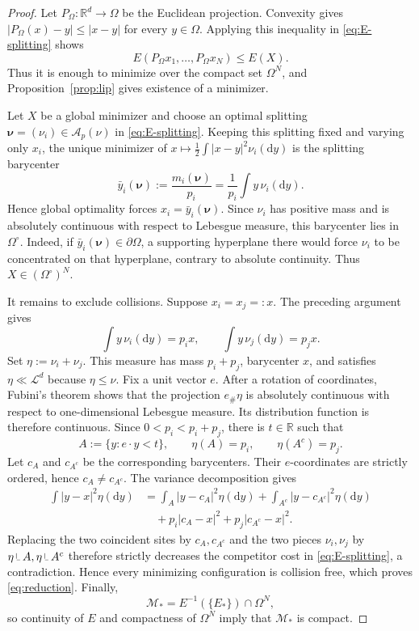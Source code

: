 \documentclass[11pt]{article}
\def\R{\mathbb{R}}
\def\Ac{{\mathcal A}}
\def\Mc{{\mathcal M}}
\newcommand{\dd}{\mathrm{d}}
\newcommand{\Leb}{\mathcal L}
\newcommand{\restr}{\mathbin{\vrule height 1.4ex depth -0.3ex width 0.08ex\vrule height 0.08ex depth -0.02ex width 0.7ex}}
\theoremstyle{definition}
\theoremstyle{remark}
\numberwithin{equation}{section}
\begin{document}
\begin{proof}
Let $P_\Omega:\R^d\to\Omega$ be the Euclidean projection.  Convexity gives
$|P_\Omega(x)-y|\le|x-y|$ for every $y\in\Omega$.  Applying this inequality in
\eqref{eq:E-splitting} shows
\begin{equation}\label{eq:projection-lowers}
 E(P_\Omega x_1,\ldots,P_\Omega x_N)\le E(X).
\end{equation}
Thus it is enough to minimize over the compact set $\Omega^N$, and Proposition~\ref{prop:lip}
gives existence of a minimizer.

Let $X$ be a global minimizer and choose an optimal splitting
$\boldsymbol\nu=(\nu_i)\in\Ac_p(\nu)$ in \eqref{eq:E-splitting}.  Keeping this splitting fixed and
varying only $x_i$, the unique minimizer of
$x\mapsto\frac12\int|x-y|^2\nu_i(\dd y)$ is the splitting barycenter
\begin{equation}\label{eq:barycenter-splitting}
 \bar y_i(\boldsymbol\nu):=\frac{m_i(\boldsymbol\nu)}{p_i}
 =\frac1{p_i}\int y\,\nu_i(\dd y).
\end{equation}
Hence global optimality forces $x_i=\bar y_i(\boldsymbol\nu)$.  Since $\nu_i$ has positive mass
and is absolutely continuous with respect to Lebesgue measure, this barycenter lies in
$\Omega^\circ$.  Indeed, if $\bar y_i(\boldsymbol\nu)\in\partial\Omega$, a supporting hyperplane
there would force $\nu_i$ to be concentrated on that hyperplane, contrary to absolute continuity.
Thus $X\in(\Omega^\circ)^N$.

It remains to exclude collisions.  Suppose $x_i=x_j=:x$.  The preceding argument gives
\[
 \int y\,\nu_i(\dd y)=p_ix,
 \qquad
 \int y\,\nu_j(\dd y)=p_jx.
\]
Set $\eta:=\nu_i+\nu_j$.  This measure has mass $p_i+p_j$, barycenter $x$, and satisfies
$\eta\ll\Leb^d$ because $\eta\le\nu$.  Fix a unit vector $e$.  After a rotation of coordinates,
Fubini's theorem shows that the projection $e_\#\eta$ is absolutely continuous with respect to
one-dimensional Lebesgue measure.  Its distribution function is therefore continuous.  Since
$0<p_i<p_i+p_j$, there is $t\in\R$ such that
\[
 A:=\{y:e\cdot y<t\},
 \qquad
 \eta(A)=p_i,
 \qquad
 \eta(A^c)=p_j.
\]
Let $c_A$ and $c_{A^c}$ be the corresponding barycenters.  Their $e$-coordinates are strictly
ordered, hence $c_A\ne c_{A^c}$.  The variance decomposition gives
\begin{align*}
 \int|y-x|^2\eta(\dd y)
 &={}
 \int_A|y-c_A|^2\eta(\dd y)
 +\int_{A^c}|y-c_{A^c}|^2\eta(\dd y)\\
 &\quad
 +p_i|c_A-x|^2+p_j|c_{A^c}-x|^2.
\end{align*}
Replacing the two coincident sites by $c_A,c_{A^c}$ and the two pieces $\nu_i,\nu_j$ by
$\eta\restr A,\eta\restr A^c$ therefore strictly decreases the competitor cost in
\eqref{eq:E-splitting}, a contradiction.  Hence every minimizing configuration is collision free,
which proves \eqref{eq:reduction}.  Finally,
\[
 \Mc_*=E^{-1}(\{E_*\})\cap\Omega^N,
\]
so continuity of $E$ and compactness of $\Omega^N$ imply that $\Mc_*$ is compact.
\end{proof}
\end{document}
